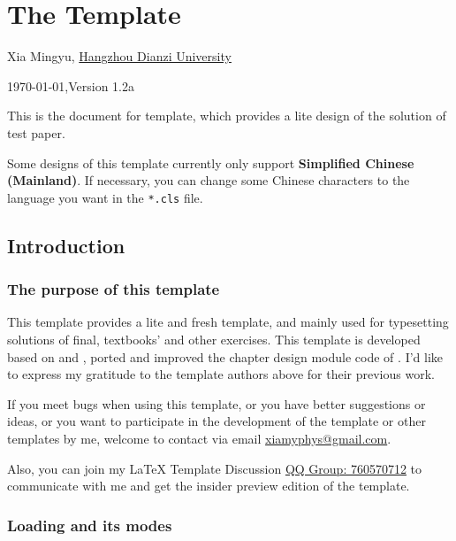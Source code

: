 \chapter{The  Template}
\fancyhead[R]{\color{H7}\rightmark\,}

\centerline{Xia Mingyu, \href{https://www.hdu.edu.cn}{Hangzhou Dianzi University}}
\yyyymmdddate
\centerline{}
\centerline{\today,\quad Version 1.2a}

This is the document for  template, which provides a lite design of the solution of test paper.

Some designs of this template currently only support \textbf{Simplified Chinese (Mainland)}. If necessary, you can change some Chinese characters to the language you want in the \verb|*.cls| file.

\section{Introduction}
\subsection{The purpose of this template}
This template provides a lite and fresh template, and mainly used for typesetting solutions of final, textbooks' and other exercises. This template is developed based on  and \href{https://github.com/Azure1210/VividBooK}{}, ported and improved the chapter design module code of \href{https://www.overleaf.com/latex/templates/the-legrand-orange-book-template-english/jtctyfmnpppc}{}. I'd like to express my gratitude to the template authors above for their previous work.

If you meet bugs when using this template, or you have better suggestions or ideas, or you want to participate in the development of the template or other templates by me, welcome to contact via email \href{mailto:xiamyphys@gmail.com}{xiamyphys@gmail.com}.

Also, you can join my \textsf\LaTeX{} Template Discussion \href{https://qm.qq.com/q/OnHzbNvVAG}{QQ Group: 760570712} to communicate with me and get the insider preview edition of the template.

\subsection{Loading  and its modes}

